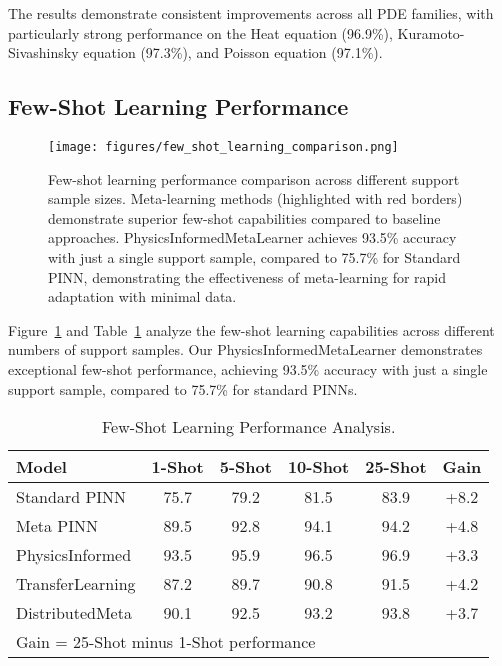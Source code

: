 \documentclass[review]{elsarticle}
\begin{document}
The results demonstrate consistent improvements across all PDE families, with particularly strong performance on the Heat equation (96.9\%), Kuramoto-Sivashinsky equation (97.3\%), and Poisson equation (97.1\%).

\subsection{Few-Shot Learning Performance}

\begin{figure}[htbp]
\centering
\texttt{[image: figures/few\_shot\_learning\_comparison.png]}
\caption{Few-shot learning performance comparison across different support sample sizes. Meta-learning methods (highlighted with red borders) demonstrate superior few-shot capabilities compared to baseline approaches. PhysicsInformedMetaLearner achieves 93.5\% accuracy with just a single support sample, compared to 75.7\% for Standard PINN, demonstrating the effectiveness of meta-learning for rapid adaptation with minimal data.}
\label{fig:few_shot_comparison}
\end{figure}

Figure~\ref{fig:few_shot_comparison} and Table~\ref{tab:few_shot_performance} analyze the few-shot learning capabilities across different numbers of support samples. Our PhysicsInformedMetaLearner demonstrates exceptional few-shot performance, achieving 93.5\% accuracy with just a single support sample, compared to 75.7\% for standard PINNs.

\begin{table}[htbp]
\centering
\caption{Few-Shot Learning Performance Analysis.}
\label{tab:few_shot_performance}
\begin{tabular}{lccccc}
\toprule
\textbf{Model} & \textbf{1-Shot} & \textbf{5-Shot} & \textbf{10-Shot} & \textbf{25-Shot} & \textbf{Gain} \\
\midrule
Standard PINN & 75.7 & 79.2 & 81.5 & 83.9 & +8.2 \\
Meta PINN & 89.5 & 92.8 & 94.1 & 94.2 & +4.8 \\
PhysicsInformed & 93.5 & 95.9 & 96.5 & 96.9 & +3.3 \\
TransferLearning & 87.2 & 89.7 & 90.8 & 91.5 & +4.2 \\
DistributedMeta & 90.1 & 92.5 & 93.2 & 93.8 & +3.7 \\
\bottomrule
\multicolumn{6}{l}{\footnotesize Gain = 25-Shot minus 1-Shot performance} \\
\end{tabular}
\end{table}
\end{document}
